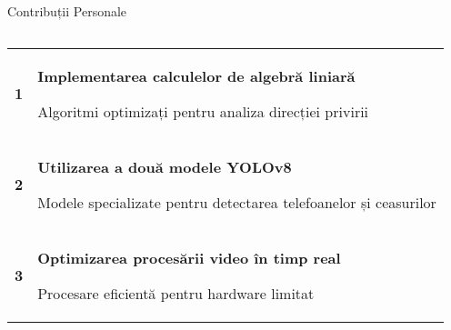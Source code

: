 \documentclass[aspectratio=169,9pt]{beamer}
\newenvironment{cardblock}[1]{%
    \begin{block}{#1}
}{%
    \end{block}
}
\begin{document}
\begin{frame}{Contribuții Personale}
        \vspace{-0.5cm}
        \begin{columns}
                        \begin{cardblock}{}
                                \begin{tabular}{cp{6.3cm}}
                                        \cellcolor{lightblue}\textcolor{mainblue}{\textbf{1}} & 
                                        \begin{minipage}[t]{6.3cm}
                                                \textcolor{mainblue}{\textbf{Implementarea calculelor de algebră liniară}}
                                                
                                                \scriptsize Algoritmi optimizați pentru analiza direcției privirii
                                        \end{minipage} \\[0.3cm]
                                        
                                        \cellcolor{lightblue}\textcolor{mainblue}{\textbf{2}} & 
                                        \begin{minipage}[t]{6.3cm}
                                                \textcolor{mainblue}{\textbf{Utilizarea a două modele YOLOv8}}
                                                
                                                \scriptsize Modele specializate pentru detectarea telefoanelor și ceasurilor
                                        \end{minipage} \\[0.3cm]
                                        
                                        \cellcolor{lightblue}\textcolor{mainblue}{\textbf{3}} & 
                                        \begin{minipage}[t]{6.3cm}
                                                \textcolor{mainblue}{\textbf{Optimizarea procesării video în timp real}}
                                                
                                                \scriptsize Procesare eficientă pentru hardware limitat
                                        \end{minipage}
                                \end{tabular}
                        \end{cardblock}
                        

\end{columns}
\end{frame}
\end{document}
